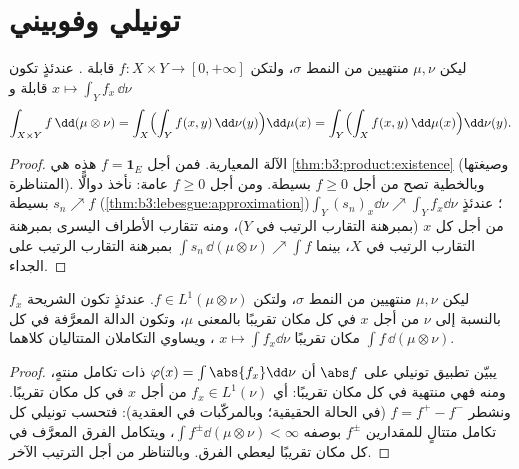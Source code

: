 \section{تونيلي وفوبيني}

\begin{theorem}[تونيلي]\label{thm:b3:product:tonelli}
ليكن $\mu, \nu$ منتهيين من النمط $\sigma$، ولتكن $f \colon X\times Y \to [0,
+\infty]$ قابلة
. عندئذٍ تكون $x \mapsto \int_Y f_x\,\dd\nu$ قابلة  و
\[
\int_{X\times Y}f\,\dd(\mu\otimes\nu)
= \int_X\Bigl(\int_Y f(x,y)\,\dd\nu(y)\Bigr)\dd\mu(x)
= \int_Y\Bigl(\int_X f(x,y)\,\dd\mu(x)\Bigr)\dd\nu(y).
\]
\end{theorem}

\begin{proof}
الآلة المعيارية. فمن أجل $f = \mathbf 1_E$ هذه هي \cref{thm:b3:product:existence} (وصيغتها
المتناظرة). وبالخطية تصح من أجل $f \geq 0$ بسيطة. ومن أجل
$f \geq
0$ عامة: نأخذ دوالًّا بسيطة $s_n \nearrow f$ (\cref{thm:b3:lebesgue:approximation})؛
عندئذٍ $\int_Y(s_n)_x
\dd\nu \nearrow \int_Y f_x\dd\nu$ من أجل كل $x$ (بمبرهنة التقارب الرتيب في $Y$)،
ومنه تتقارب الأطراف اليسرى بمبرهنة التقارب الرتيب في $X$، بينما
$\int s_n\,\dd(\mu\otimes\nu) \nearrow \int f$ بمبرهنة التقارب الرتيب على الجداء.
\end{proof}

\begin{theorem}[فوبيني]\label{thm:b3:product:fubini}
ليكن $\mu, \nu$ منتهيين من النمط $\sigma$، ولتكن $f \in L^1(\mu\otimes\nu)$. عندئذٍ
تكون الشريحة $f_x$  بالنسبة إلى $\nu$ من أجل $x$
في كل مكان تقريبًا بالمعنى $\mu$، وتكون الدالة المعرَّفة في كل
مكان تقريبًا $x \mapsto \int f_x\dd\nu$ ، ويساوي التكاملان المتتاليان
كلاهما $\int f\,\dd(\mu\otimes\nu)$.
\end{theorem}

\begin{proof}
يبيّن تطبيق تونيلي على $\abs f$ أن $\varphi(x) = \int\abs{f_x}
\dd\nu$ ذات تكامل منتهٍ، ومنه
فهي منتهية في كل مكان تقريبًا: أي $f_x \in
L^1(\nu)$ من أجل $x$ في كل مكان
تقريبًا. ونشطر $f = f^+ - f^-$ (في الحالة الحقيقية؛ وبالمركّبات
في العقدية): فتحسب تونيلي كل تكامل متتالٍ للمقدارين $f^\pm$
بوصفه $\int f^\pm\dd(\mu\otimes\nu) <
\infty$، ويتكامل الفرق المعرَّف في كل مكان تقريبًا ليعطي
الفرق. وبالتناظر من أجل الترتيب الآخر.
\end{proof}

